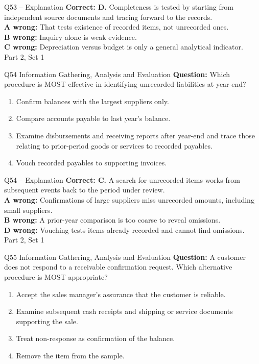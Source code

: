 \documentclass[aspectratio=169,10pt]{beamer}
\begin{document}
\begin{frame}[t]{Q53 -- Explanation}
	\footnotesize
	\textbf{Correct: D.} Completeness is tested by starting from independent source documents and tracing forward to the records. \\[5pt]
\textbf{A wrong:} That tests existence of recorded items, not unrecorded ones. \\[3pt]
\textbf{B wrong:} Inquiry alone is weak evidence. \\[3pt]
\textbf{C wrong:} Depreciation versus budget is only a general analytical indicator. \\[3pt]
	\vfill {\tiny Part 2, Set 1}
\end{frame}
\begin{frame}[t]{Q54 \hfill {\scriptsize Information Gathering, Analysis and Evaluation}}
	\small
	\textbf{Question:} Which procedure is MOST effective in identifying unrecorded liabilities at year-end?
	\begin{enumerate}[label=\Alph*.,itemsep=1pt,topsep=3pt]
			\item Confirm balances with the largest suppliers only.
			\item Compare accounts payable to last year's balance.
			\item Examine disbursements and receiving reports after year-end and trace those relating to prior-period goods or services to recorded payables.
			\item Vouch recorded payables to supporting invoices.
	\end{enumerate}
\end{frame}
\begin{frame}[t]{Q54 -- Explanation}
	\footnotesize
	\textbf{Correct: C.} A search for unrecorded items works from subsequent events back to the period under review. \\[5pt]
\textbf{A wrong:} Confirmations of large suppliers miss unrecorded amounts, including small suppliers. \\[3pt]
\textbf{B wrong:} A prior-year comparison is too coarse to reveal omissions. \\[3pt]
\textbf{D wrong:} Vouching tests items already recorded and cannot find omissions. \\[3pt]
	\vfill {\tiny Part 2, Set 1}
\end{frame}
\begin{frame}[t]{Q55 \hfill {\scriptsize Information Gathering, Analysis and Evaluation}}
	\small
	\textbf{Question:} A customer does not respond to a receivable confirmation request. Which alternative procedure is MOST appropriate?
	\begin{enumerate}[label=\Alph*.,itemsep=1pt,topsep=3pt]
			\item Accept the sales manager's assurance that the customer is reliable.
			\item Examine subsequent cash receipts and shipping or service documents supporting the sale.
			\item Treat non-response as confirmation of the balance.
			\item Remove the item from the sample.
	\end{enumerate}
\end{frame}
\end{document}
